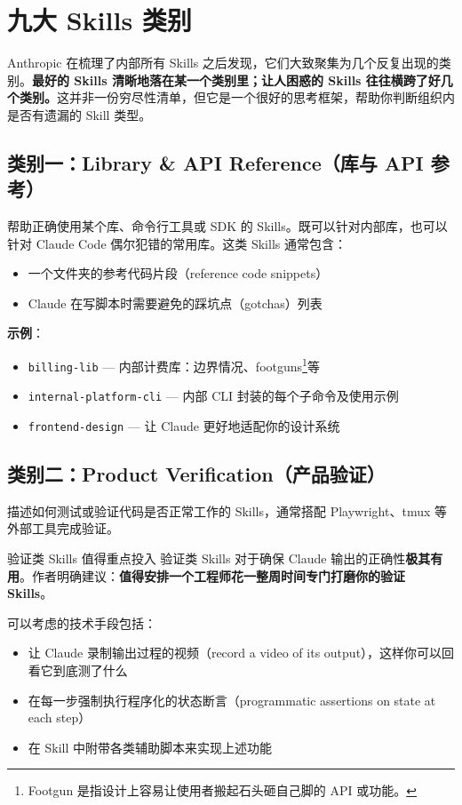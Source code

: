 \section{九大 Skills 类别}

Anthropic 在梳理了内部所有 Skills 之后发现，它们大致聚集为几个反复出现的类别。\textbf{最好的 Skills 清晰地落在某一个类别里；让人困惑的 Skills 往往横跨了好几个类别。}这并非一份穷尽性清单，但它是一个很好的思考框架，帮助你判断组织内是否有遗漏的 Skill 类型。

\subsection{类别一：Library \& API Reference（库与 API 参考）}

帮助正确使用某个库、命令行工具或 SDK 的 Skills。既可以针对内部库，也可以针对 Claude Code 偶尔犯错的常用库。这类 Skills 通常包含：
\begin{itemize}
    \item 一个文件夹的参考代码片段（reference code snippets）
    \item Claude 在写脚本时需要避免的踩坑点（gotchas）列表
\end{itemize}

\textbf{示例}：
\begin{itemize}
    \item \texttt{billing-lib} --- 内部计费库：边界情况、footguns\footnote{Footgun 是指设计上容易让使用者搬起石头砸自己脚的 API 或功能。}等
    \item \texttt{internal-platform-cli} --- 内部 CLI 封装的每个子命令及使用示例
    \item \texttt{frontend-design} --- 让 Claude 更好地适配你的设计系统
\end{itemize}

\subsection{类别二：Product Verification（产品验证）}

描述如何测试或验证代码是否正常工作的 Skills，通常搭配 Playwright、tmux 等外部工具完成验证。

\begin{knowledgebox}{验证类 Skills 值得重点投入}
验证类 Skills 对于确保 Claude 输出的正确性\textbf{极其有用}。作者明确建议：\textbf{值得安排一个工程师花一整周时间专门打磨你的验证 Skills}。

可以考虑的技术手段包括：
\begin{itemize}
    \item 让 Claude 录制输出过程的视频（record a video of its output），这样你可以回看它到底测了什么
    \item 在每一步强制执行程序化的状态断言（programmatic assertions on state at each step）
    \item 在 Skill 中附带各类辅助脚本来实现上述功能
\end{itemize}
\end{knowledgebox}

